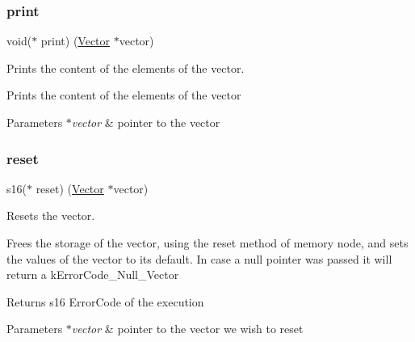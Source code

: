 \subsubsection{\texorpdfstring{print}{print}}
{\footnotesize\ttfamily void($\ast$ print) (\hyperlink{structadt__vector__s}{Vector} $\ast$vector)}



Prints the content of the elements of the vector. 

Prints the content of the elements of the vector


\begin{DoxyParams}{Parameters}
{\em $\ast$vector} & pointer to the vector \\
\hline
\end{DoxyParams}
\mbox{\label{structadt__vector__ops__s_a46a0e410956a547eaeffccaab227b280}} 
\subsubsection{\texorpdfstring{reset}{reset}}
{\footnotesize\ttfamily s16($\ast$ reset) (\hyperlink{structadt__vector__s}{Vector} $\ast$vector)}



Resets the vector. 

Frees the storage of the vector, using the reset method of memory node, and sets the values of the vector to it\textquotesingle{}s default. In case a null pointer was passed it will return a k\+Error\+Code\+\_\+\+Null\+\_\+\+Vector

\begin{DoxyReturn}{Returns}
s16 Error\+Code of the execution 
\end{DoxyReturn}

\begin{DoxyParams}{Parameters}
{\em $\ast$vector} & pointer to the vector we wish to reset \\
\hline
\end{DoxyParams}
\mbox{\label{structadt__vector__ops__s_a682fe6403089259f5317763665b1faa7}} 
